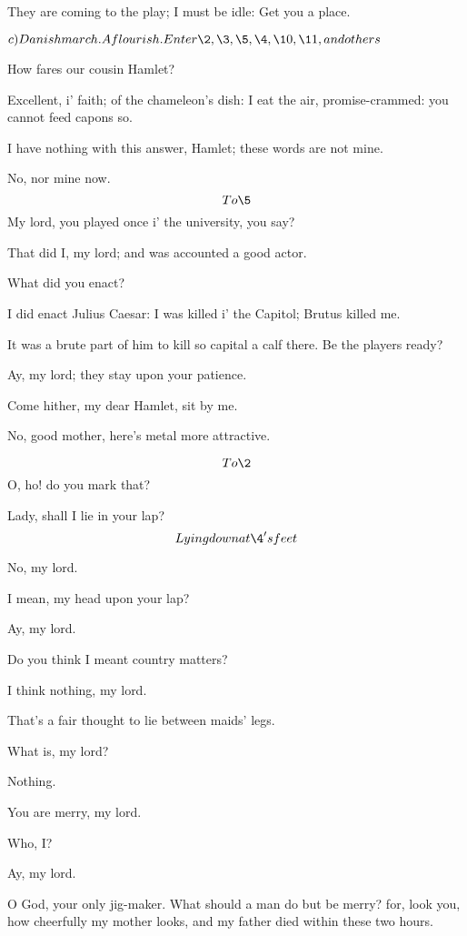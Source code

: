 \documentclass[11pt]{book}
\begin{document}
\1	They are coming to the play; I must be idle:
	Get you a place.

\Prosa

	\(c)Danish march. A flourish. \\Enter \2, \3, \5, \4,\\
    \10, \11, and others\)

\2	How fares our cousin Hamlet?

\1	Excellent, i' faith; of the chameleon's dish: I eat
	the air, promise-crammed: you cannot feed capons so.

\2	I have nothing with this answer, Hamlet; these words
	are not mine.

\1	No, nor mine now. \[To \5\] My lord, you played once
   i' the university, you say?

\5	That did I, my lord; and was accounted a good actor.

\1	What did you enact?

\5	I did enact Julius Caesar: I was killed i' the
	Capitol; Brutus killed me.

\1	It was a brute part of him to kill so capital a calf
	there. Be the players ready?

	Ay, my lord; they stay upon your patience.

\3	Come hither, my dear Hamlet, sit by me.

\1	No, good mother, here's metal more attractive.

\aparte\5 \[To \2\]  O, ho! do you mark that?

\1	Lady, shall I lie in your lap? \[Lying down at \4's feet\]

\4	No, my lord.

\1	I mean, my head upon your lap?

\4	Ay, my lord.

\1	Do you think I meant country matters?

\4	I think nothing, my lord.

\1	That's a fair thought to lie between maids' legs.

\4	What is, my lord?

\1	Nothing.

\4	You are merry, my lord.

\1	Who, I?

\4	Ay, my lord.

\1	O God, your only jig-maker. What should a man do
	but be merry? for, look you, how cheerfully my
	mother looks, and my father died within these two hours.
\end{document}
